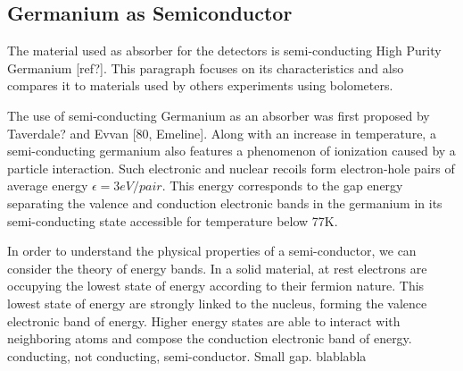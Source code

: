 \subsection{Germanium as Semiconductor}

The material used as absorber for the detectors is semi-conducting High Purity Germanium [ref?].
This paragraph focuses on its characteristics and also compares it to materials used by others experiments using bolometers.

The use of semi-conducting Germanium as an absorber was first proposed by Taverdale? and Evvan [80, Emeline].
Along with an increase in temperature, a semi-conducting germanium also features a phenomenon of ionization caused by a particle interaction. Such electronic and nuclear recoils form electron-hole pairs of average energy $\epsilon = 3 eV/pair$. This energy corresponds to the gap energy separating the valence and conduction electronic bands in the germanium in its semi-conducting state accessible for temperature below 77K.

In order to understand the physical properties of a semi-conductor, we can consider the theory of energy bands. In a solid material, at rest electrons are occupying the lowest state of energy according to their fermion nature. This lowest state of energy are strongly linked to the nucleus, forming the valence electronic band of energy. Higher energy states are able to interact with neighboring atoms and compose the conduction electronic band of energy.
conducting, not conducting, semi-conductor. Small gap. blablabla

